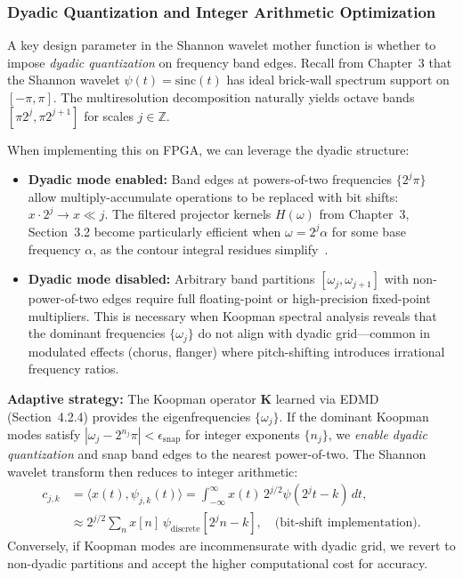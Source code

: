 \subsubsection{Dyadic Quantization and Integer Arithmetic Optimization}

A key design parameter in the Shannon wavelet mother function is whether to impose \emph{dyadic quantization} on frequency band edges. Recall from Chapter~3 that the Shannon wavelet $\psi(t) = \text{sinc}(t)$ has ideal brick-wall spectrum support on $[-\pi, \pi]$. The multiresolution decomposition naturally yields octave bands $[\pi 2^j, \pi 2^{j+1}]$ for scales $j \in \mathbb{Z}$.

When implementing this on FPGA, we can leverage the dyadic structure:
\begin{itemize}
\item \textbf{Dyadic mode enabled:} Band edges at powers-of-two frequencies $\{2^j \pi\}$ allow multiply-accumulate operations to be replaced with bit shifts: $x \cdot 2^j \to x \ll j$. The filtered projector kernels $H(\omega)$ from Chapter~3, Section~3.2 become particularly efficient when $\omega = 2^j \alpha$ for some base frequency $\alpha$, as the contour integral residues simplify~\cite{Unser2000}.

\item \textbf{Dyadic mode disabled:} Arbitrary band partitions $[\omega_j, \omega_{j+1}]$ with non-power-of-two edges require full floating-point or high-precision fixed-point multipliers. This is necessary when Koopman spectral analysis reveals that the dominant frequencies $\{\omega_j\}$ do not align with dyadic grid—common in modulated effects (chorus, flanger) where pitch-shifting introduces irrational frequency ratios.
\end{itemize}

\noindent\textbf{Adaptive strategy:} The Koopman operator $\mathbf{K}$ learned via EDMD (Section~4.2.4) provides the eigenfrequencies $\{\omega_j\}$. If the dominant Koopman modes satisfy $|\omega_j - 2^{n_j}\pi| < \epsilon_{\text{snap}}$ for integer exponents $\{n_j\}$, we \emph{enable dyadic quantization} and snap band edges to the nearest power-of-two. The Shannon wavelet transform then reduces to integer arithmetic:
\begin{align}
c_{j,k} &= \langle x(t), \psi_{j,k}(t) \rangle = \int_{-\infty}^\infty x(t) \, 2^{j/2} \psi(2^j t - k) \, dt, \\
&\approx 2^{j/2} \sum_{n} x[n] \, \psi_{\text{discrete}}[2^j n - k], \quad \text{(bit-shift implementation)}.
\end{align}
Conversely, if Koopman modes are incommensurate with dyadic grid, we revert to non-dyadic partitions and accept the higher computational cost for accuracy.

